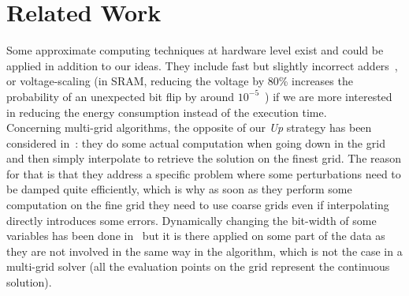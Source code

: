 \section{Related Work}
\label{sec:related}

   Some approximate computing techniques at hardware level exist and could be applied in addition to our ideas. They include fast but slightly incorrect adders~\cite{Gupta:2011}, or voltage-scaling (in SRAM, reducing
   the voltage by 80\% increases the probability of an unexpected bit flip by around $10^{-5}$~\cite{Sampson:2011})
   if we are more interested in reducing the energy consumption instead of the execution time.\\
   Concerning multi-grid algorithms, the opposite of our \emph{Up} strategy has been considered in~\cite{JAMESON}: they do some actual computation when going down in the grid and then simply interpolate to retrieve the solution on the finest grid. The reason for that is that they
   address a specific problem where some perturbations need to be damped quite efficiently, which is why as soon as they perform some computation on the fine grid they need to use coarse grids even if interpolating directly introduces some errors.
   Dynamically changing the bit-width of some variables has been done in~\cite{Park:2010} but it is there applied on some part of the data as they are not involved in the same way in the algorithm,
   which is not the case in a multi-grid solver (all the evaluation points on the grid represent the continuous solution).


